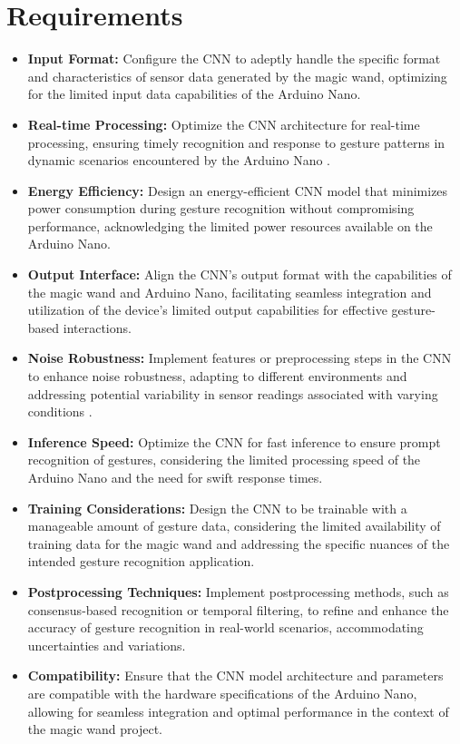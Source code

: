 \section{Requirements}
	\begin{itemize}
		\item \textbf{Input Format:} 
		Configure the CNN to adeptly handle the specific format and characteristics of sensor data generated by the magic wand, optimizing for the limited input data capabilities of the Arduino Nano.
		
		\item \textbf{Real-time Processing:} 
		Optimize the CNN architecture for real-time processing, ensuring timely recognition and response to gesture patterns in dynamic scenarios encountered by the Arduino Nano \cite{Munoz:2019}.
		
		\item \textbf{Energy Efficiency:} 
		Design an energy-efficient CNN model that minimizes power consumption during gesture recognition without compromising performance, acknowledging the limited power resources available on the Arduino Nano.
		
		\item \textbf{Output Interface:}
		Align the CNN's output format with the capabilities of the magic wand and Arduino Nano, facilitating seamless integration and utilization of the device's limited output capabilities for effective gesture-based interactions.
		
		\item \textbf{Noise Robustness:} 
		Implement features or preprocessing steps in the CNN to enhance noise robustness, adapting to different environments and addressing potential variability in sensor readings associated with varying conditions \cite{Munoz:2019}.
		
		\item \textbf{Inference Speed:}
		Optimize the CNN for fast inference to ensure prompt recognition of gestures, considering the limited processing speed of the Arduino Nano and the need for swift response times.
		
		\item \textbf{Training Considerations:} 
		Design the CNN to be trainable with a manageable amount of gesture data, considering the limited availability of training data for the magic wand and addressing the specific nuances of the intended gesture recognition application.
		
		\item \textbf{Postprocessing Techniques:} 
		Implement postprocessing methods, such as consensus-based recognition or temporal filtering, to refine and enhance the accuracy of gesture recognition in real-world scenarios, accommodating uncertainties and variations.
		
		\item \textbf{Compatibility:} 
		Ensure that the CNN model architecture and parameters are compatible with the hardware specifications of the Arduino Nano, allowing for seamless integration and optimal performance in the context of the magic wand project.

	\end{itemize}


